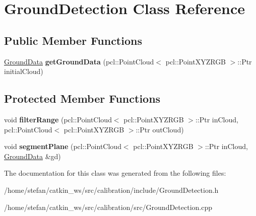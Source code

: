 \hypertarget{classGroundDetection}{\section{\-Ground\-Detection \-Class \-Reference}
\label{classGroundDetection}
}
\subsection*{\-Public \-Member \-Functions}
\begin{DoxyCompactItemize}
\item 
\hypertarget{classGroundDetection_aa991673a7cfb56095d072e736ebcfb7a}{\hyperlink{classGroundData}{\-Ground\-Data} {\bfseries get\-Ground\-Data} (pcl\-::\-Point\-Cloud$<$ pcl\-::\-Point\-X\-Y\-Z\-R\-G\-B $>$\-::\-Ptr initial\-Cloud)}\label{classGroundDetection_aa991673a7cfb56095d072e736ebcfb7a}

\end{DoxyCompactItemize}
\subsection*{\-Protected \-Member \-Functions}
\begin{DoxyCompactItemize}
\item 
\hypertarget{classGroundDetection_a252f44f0381a8f8acdfdd56e477cbfb7}{void {\bfseries filter\-Range} (pcl\-::\-Point\-Cloud$<$ pcl\-::\-Point\-X\-Y\-Z\-R\-G\-B $>$\-::\-Ptr in\-Cloud, pcl\-::\-Point\-Cloud$<$ pcl\-::\-Point\-X\-Y\-Z\-R\-G\-B $>$\-::\-Ptr out\-Cloud)}\label{classGroundDetection_a252f44f0381a8f8acdfdd56e477cbfb7}

\item 
\hypertarget{classGroundDetection_a13890fa639de4c021ca80121cffb76e3}{void {\bfseries segment\-Plane} (pcl\-::\-Point\-Cloud$<$ pcl\-::\-Point\-X\-Y\-Z\-R\-G\-B $>$\-::\-Ptr in\-Cloud, \hyperlink{classGroundData}{\-Ground\-Data} \&gd)}\label{classGroundDetection_a13890fa639de4c021ca80121cffb76e3}

\end{DoxyCompactItemize}


\-The documentation for this class was generated from the following files\-:\begin{DoxyCompactItemize}
\item 
/home/stefan/catkin\-\_\-ws/src/calibration/include/\-Ground\-Detection.\-h\item 
/home/stefan/catkin\-\_\-ws/src/calibration/src/\-Ground\-Detection.\-cpp\end{DoxyCompactItemize}
